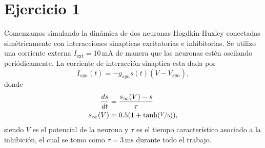 \section*{Ejercicio 1}
\graphicspath{{Figuras/ej_01/}}

Comenzamos simulando la dinámica de dos neuronas Hogdkin-Huxley \cite{HH} conectadas simétricamente con interacciones sinapticas excitatorias e inhibitorias. Se utilizo una corriente externa $I_{\text{ext}}=10\,\text{mA}$ de manera que las neuronas estén oscilando periódicamente. La corriente de interacción sinaptica esta dada por
\begin{equation}
    I_{syn}(t) = -g_{syn} s(t) (V-V_{syn}),
\end{equation}
donde
\begin{align}
    \frac{ds}{dt}&= \frac{s_\infty(V) - s}{\tau}\\
    s_\infty(V)&= 0.5(1+\text{tanh}(\nicefrac{V}{5})),
\end{align}
siendo $V$ es el potencial de  la neurona y $\tau$ es el tiempo característico asociado a la inhibición, el cual se tomo como $\tau = 3\,\text{ms}$ durante todo el trabajo.

